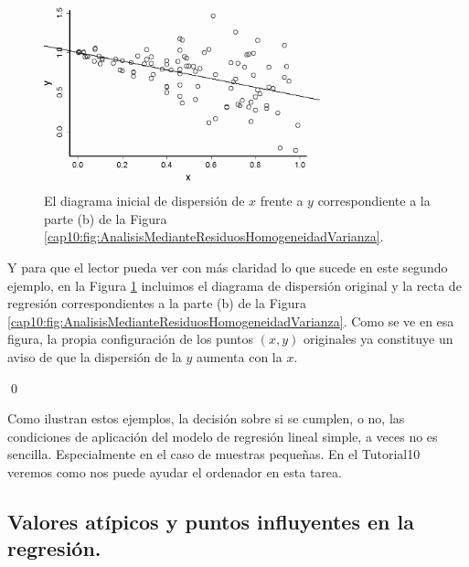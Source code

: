 \begin{ejemplo}
\begin{figure}[h!]
\begin{center}
\begin{enColor}
\end{enColor}
\begin{bn}
\includegraphics[width=8cm]{../fig/Cap10-EjemploAnalisisResiduos06-bn.png}
\end{bn}
\caption{El diagrama inicial de dispersión de $x$ frente a $y$ correspondiente a la parte (b) de la Figura \ref{cap10:fig:AnalisisMedianteResiduosHomogeneidadVarianza}.}
\label{cap10:fig:AnalisisMedianteResiduosHomogeneidadVarianza2}
\end{center}
\end{figure}

Y para que el lector pueda ver con más claridad lo que sucede en este segundo ejemplo, en la Figura \ref{cap10:fig:AnalisisMedianteResiduosHomogeneidadVarianza2} incluimos el diagrama de dispersión original y la recta de regresión correspondientes a la parte (b) de la Figura \ref{cap10:fig:AnalisisMedianteResiduosHomogeneidadVarianza}. Como se ve en esa figura, la propia configuración de los puntos $(x,y)$ originales ya constituye un aviso de que la dispersión de la $y$ aumenta con la $x$.

\qed
\end{ejemplo}
Como ilustran estos ejemplos, la decisión sobre si se cumplen, o no, las condiciones de aplicación del modelo de regresión lineal simple, a veces no es sencilla. Especialmente en el caso de muestras pequeñas. En el Tutorial10 veremos como nos puede ayudar el ordenador en esta tarea.

\subsection{Valores atípicos y puntos influyentes en la regresión.}
\label{cap10:subsec:ValoresAtipicosPuntosInfluyentesRegresion}

